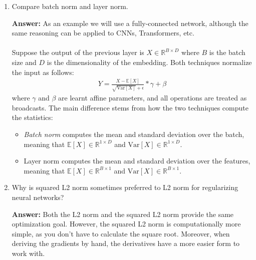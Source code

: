 \documentclass{article}
\newenvironment{QandA}{\begin{enumerate}[label=\arabic*.]}{\end{enumerate}}
\newenvironment{answer}{\par\normalfont \textbf{Answer:}}{}
\newcommand{\R}{\mathbb{R}}
\newcommand{\Exp}[1]{\mathbb{E}\left[ #1 \right]}
\newcommand{\Vari}[1]{\text{Var}\left[ #1 \right]}
\begin{document}
\begin{QandA}
    \item Compare batch norm and layer norm.
    \begin{answer}
        As an example we will use a fully-connected network, although the same reasoning can be applied to CNNs, Transformers, etc. \\\\
        Suppose the output of the previous layer is $X \in \R^{B \times D}$ where $B$ is the batch size and $D$ is the dimensionality of the embedding. Both techniques normalize the input as follows:
        \begin{align*}
            Y = \frac{X - \Exp{X}}{\sqrt{\Vari{X}} + \epsilon} * \gamma + \beta
        \end{align*}
        where $\gamma$ and $\beta$ are learnt affine parameters, and all operations are treated as broadcasts. The main difference stems from how the two techniques compute the statistics:
        \begin{itemize}
            \item \textit{Batch norm} computes the mean and standard deviation over the batch, meaning that $\Exp{X} \in \R^{1 \times D}$ and $\Vari{X} \in \R^{1 \times D}$.
            \item Layer norm computes the mean and standard deviation over the features, meaning that $\Exp{X} \in \R^{B \times 1}$ and $\Vari{X} \in \R^{B \times 1}$.
        \end{itemize}
    \end{answer}

    \item Why is squared L2 norm sometimes preferred to L2 norm for regularizing neural networks?
    \begin{answer}
        Both the L2 norm and the squared L2 norm provide the same optimization goal. However, the squared L2 norm is computationally more simple, as you don't have to calculate the square root. Moreover, when deriving the gradients by hand, the derivatives have a more easier form to work with. 
    \end{answer}


\end{QandA}
\end{document}

